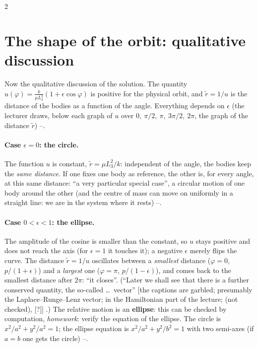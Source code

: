 \begin{paracol}{2}
\section{The shape of the orbit: qualitative discussion}\label{sec:tb-qual}

Now the qualitative discussion of the solution. The quantity $u(\varphi)=\frac{k}{\mu L_3^2}(1+\epsilon\cos\varphi)$ is positive for the physical orbit, and $\tilde r=1/u$ is the distance of the bodies as a function of the angle. Everything depends on $\epsilon$ (the lecturer draws, below each graph of $u$ over $0,\ \pi/2,\ \pi,\ 3\pi/2,\ 2\pi$, the graph of the distance $\tilde r$) --.

\paragraph{Case $\epsilon=0$: the circle.} The function $u$ is constant, $\tilde r=\mu L_3^2/k$: independent of the angle, the bodies keep the \emph{same distance}. If one fixes one body as reference, the other is, for every angle, at this same distance: ``a very particular special case'', a circular motion of one body around the other (and the centre of mass can move on uniformly in a straight line: we are in the system where it rests) --.

\paragraph{Case $0<\epsilon<1$: the ellipse.} The amplitude of the cosine is smaller than the constant, so $u$ stays positive and does not reach the axis (for $\epsilon=1$ it touches it); a negative $\epsilon$ merely flips the curve. The distance $\tilde r=1/u$ oscillates between a \emph{smallest} distance ($\varphi=0$, $p/(1+\epsilon)$) and a \emph{largest} one ($\varphi=\pi$, $p/(1-\epsilon)$), and comes back to the smallest distance after $2\pi$: ``it closes''.
(``Later we shall see that there is a further conserved quantity, the so-called \dots\ vector'' [the captions are garbled; presumably the Laplace--Runge--Lenz vector; in the Hamiltonian part of the lecture; (not checked), [?]] .) The relative motion is an \textbf{ellipse}: this can be checked by computation, \emph{homework}: verify the equation of the ellipse. The circle is $x^2/a^2+y^2/a^2=1$; the ellipse equation is $x^2/a^2+y^2/b^2=1$ with two semi-axes (if $a=b$ one gets the circle) --.


\end{paracol}
